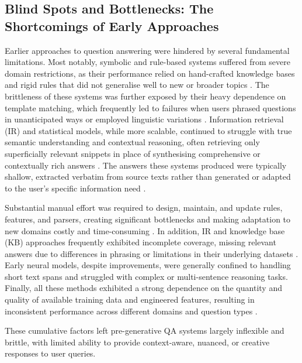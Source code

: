 \begin{spacing}{1.5}
\section{Blind Spots and Bottlenecks: The Shortcomings of Early Approaches}
Earlier approaches to question answering were hindered by several fundamental limitations. Most notably, symbolic and rule-based systems suffered from severe domain restrictions, as their performance relied on hand-crafted knowledge bases and rigid rules that did not generalise well to new or broader topics \citep{alqifari_question_2019}. The brittleness of these systems was further exposed by their heavy dependence on template matching, which frequently led to failures when users phrased questions in unanticipated ways or employed linguistic variations \citep{hirschman_natural_2001}. Information retrieval (IR) and statistical models, while more scalable, continued to struggle with true semantic understanding and contextual reasoning, often retrieving only superficially relevant snippets in place of synthesising comprehensive or contextually rich answers \citep{alanazi_question_2021, diefenbach_core_2018}. The answers these systems produced were typically shallow, extracted verbatim from source texts rather than generated or adapted to the user’s specific information need \citep{hirschman_natural_2001,alqifari_question_2019}.

Substantial manual effort was required to design, maintain, and update rules, features, and parsers, creating significant bottlenecks and making adaptation to new domains costly and time-consuming \citep{alanazi_question_2021}. In addition, IR and knowledge base (KB) approaches frequently exhibited incomplete coverage, missing relevant answers due to differences in phrasing or limitations in their underlying datasets \citep{diefenbach_core_2018}. Early neural models, despite improvements, were generally confined to handling short text spans and struggled with complex or multi-sentence reasoning tasks. Finally, all these methods exhibited a strong dependence on the quantity and quality of available training data and engineered features, resulting in inconsistent performance across different domains and question types \citep{liu_challenges_2022,alanazi_question_2021,alqifari_question_2019,diefenbach_core_2018,hirschman_natural_2001}.

These cumulative factors left pre-generative QA systems largely inflexible and brittle, with limited ability to provide context-aware, nuanced, or creative responses to user queries.


\end{spacing}
